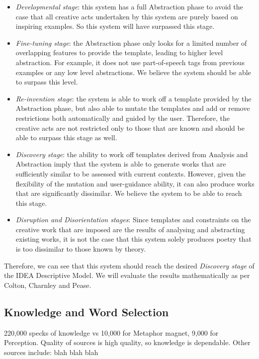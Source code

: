 \begin{itemize}
\setlength{\itemsep}{0pt}
\item{\emph{Developmental stage}: this system has a full Abstraction phase to avoid the case that all creative acts undertaken by this system are purely based on inspiring examples. So this system will have surpassed this stage.}
\item{\emph{Fine-tuning stage}: the Abstraction phase only looks for a limited number of overlapping features to provide the template, leading to higher level abstraction. For example, it does not use part-of-speech tags from previous examples or any low level abstractions. We believe the system should be able to surpass this level.}
\item{\emph{Re-invention stage}: the system is able to work off a template provided by the Abstraction phase, but also able to mutate the templates and add or remove restrictions both automatically and guided by the user. Therefore, the creative acts are not restricted only to those that are known and should be able to surpass this stage as well.}
\item{\emph{Discovery stage}: the ability to work off templates derived from Analysis and Abstraction imply that the system is able to generate works that are sufficiently similar to be assessed with current contexts. However, given the flexibility of the mutation and user-guidance ability, it can also produce works that are significantly dissimilar. We believe the system to be able to reach this stage.}
\item{\emph{Disruption and Disorientation stages}: Since templates and constraints on the creative work that are imposed are the results of analysing and abstracting existing works, it is not the case that this system solely produces poetry that is too dissimilar to those known by theory. }
\end{itemize}

Therefore, we can see that this system should reach the desired \emph{Discovery stage} of the IDEA Descriptive Model. We will evaluate the results mathematically as per Colton, Charnley and Pease.

\subsection{Knowledge and Word Selection}
220,000 specks of knowledge vs 10,000 for Metaphor magnet, 9,000 for Perception.
Quality of sources is high quality, so knowledge is dependable.
Other sources include:
blah
blah
blah

